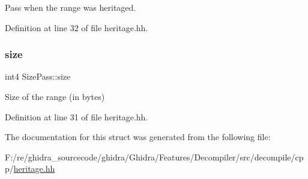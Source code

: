 Pass when the range was heritaged. 



Definition at line 32 of file heritage.\+hh.

\mbox{\label{struct_size_pass_acd245e745e9e1b1bd747530b72a710fc}} 
\subsubsection{\texorpdfstring{size}{size}}
{\footnotesize\ttfamily int4 Size\+Pass\+::size}



Size of the range (in bytes) 



Definition at line 31 of file heritage.\+hh.



The documentation for this struct was generated from the following file\+:\begin{DoxyCompactItemize}
\item 
F\+:/re/ghidra\+\_\+sourcecode/ghidra/\+Ghidra/\+Features/\+Decompiler/src/decompile/cpp/\mbox{\hyperlink{heritage_8hh}{heritage.\+hh}}\end{DoxyCompactItemize}
